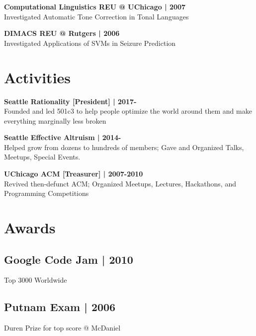 \documentclass[]{resume}
\begin{document}
\begin{minipage}[t]{0.33\textwidth}
\textbf{Computational Linguistics REU @ UChicago | 2007}\\
Investigated Automatic Tone Correction in Tonal Languages\\
\sectionsep

\textbf{DIMACS REU @ Rutgers | 2006}\\
Investigated Applications of SVMs in Seizure Prediction

\section{Activities}
\textbf{Seattle Rationality [President] | 2017-}\\
Founded and led 501c3 to help people optimize the world
around them and make everything marginally less broken
\sectionsep

\textbf{Seattle Effective Altruism | 2014-}\\
Helped grow from dozens to hundreds of members;
Gave and Organized Talks, Meetups, Special Events.\\
\sectionsep

\textbf{UChicago ACM [Treasurer] | 2007-2010} \\
Revived then-defunct ACM; Organized Meetups, Lectures,
Hackathons, and Programming Competitions \\
\sectionsep

\section{Awards}
\subsection{Google Code Jam | 2010}
Top 3000 Worldwide \\
\sectionsep
\subsection{Putnam Exam | 2006}
Duren Prize for top score @ McDaniel

\sectionsep


%
%

\end{minipage}
\hfill
\end{document}
